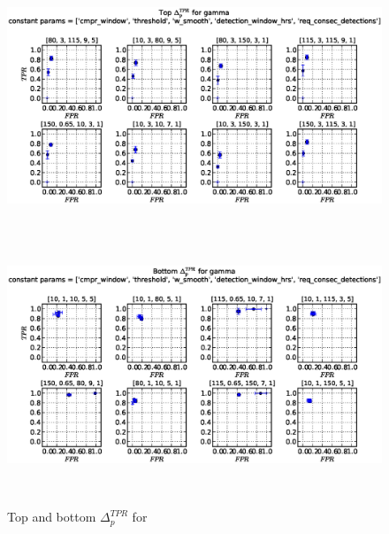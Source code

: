 \begin{figure}[!h]
\begin{center}
\includegraphics[height=3in]{../fig/final/top_tpr/gamma}
\includegraphics[height=3in]{../fig/final/bottom_tpr/gamma}
\end{center}
\caption{\label{fig:delta_top_bottom1t} Top and bottom $\Delta_p^{TPR}$ for }
\end{figure}




